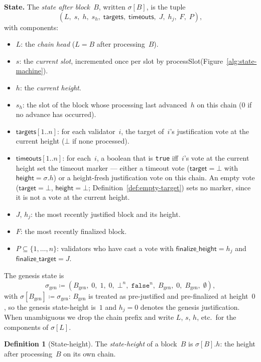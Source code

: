 \ifx\litemode\undefined\documentclass{article}\fi
\newcommand{\genesis}{\ensuremath{B_{\mathrm{gen}}}}
\newcommand{\target}{\mathsf{target}}
\newcommand{\height}{\mathsf{height}}
\newcommand{\finalizeHeight}{\mathsf{finalize\_height}}
\newcommand{\finalizeTarget}{\mathsf{finalize\_target}}
\newcommand{\targets}{\mathsf{targets}}
\newcommand{\timeouts}{\mathsf{timeouts}}
\newcommand{\processSlot}{\textsf{processSlot}\xspace}
\renewcommand{\paragraph}[1]{\vspace{7pt}\noindent\textbf{#1}}
\theoremstyle{plain}
\theoremstyle{definition}
\newtheorem{definition}{Definition}
\theoremstyle{remark}
\begin{document}
\paragraph{State.}
The \emph{state after block~$B$}, written $\sigma[B]$, is the tuple
\[
  (L,\; s,\; h,\; s_h,\; \targets,\; \timeouts,\; J,\; h_j,\; F,\; P),
\]
with components:
\begin{itemize}
  \item $L$: the \emph{chain head} ($L = B$ after processing~$B$).
  \item $s$: the \emph{current slot}, incremented once per slot by \processSlot (Figure~\ref{alg:state-machine}).
  \item $h$: the \emph{current height}.
  \item $s_h$: the slot of the block whose processing last advanced~$h$ on this chain ($0$ if no advance has occurred).
  \item $\targets[1..n]$: for each validator~$i$, the target of~$i$'s justification vote at the current height ($\bot$ if none processed).
  \item $\timeouts[1..n]$: for each~$i$, a boolean that is \texttt{true} iff~$i$'s vote at the current height set the timeout marker --- either a timeout vote ($\target = \bot$ with $\height = \sigma.h$) or a height-fresh justification vote on this chain.  An empty vote ($\target = \bot$, $\height = \bot$; Definition~\ref{def:empty-target}) sets no marker, since it is not a vote at the current height.
  \item $J$, $h_j$: the most recently justified block and its height.
  \item $F$: the most recently finalized block.
  \item $P \subseteq \{1, \ldots, n\}$: validators who have cast a vote with $\finalizeHeight = h_j$ and $\finalizeTarget = J$.
\end{itemize}
The genesis state is
\[
  \sigma_{\mathrm{gen}} \coloneqq (\genesis,\; 0,\; 1,\; 0,\; \bot^n,\; \mathtt{false}^n,\; \genesis,\; 0,\; \genesis,\; \emptyset),
\]
with $\sigma[\genesis] \coloneqq \sigma_{\mathrm{gen}}$: $\genesis$ is treated as pre-justified and pre-finalized at height~$0$, so the genesis state-height is~$1$ and $h_j = 0$ denotes the genesis justification.
When unambiguous we drop the chain prefix and write $L$, $s$, $h$, etc.\ for the components of $\sigma[L]$.

\begin{definition}[State-height]\label{def:sheight}
The \emph{state-height} of a block~$B$ is $\sigma[B].h$: the height after processing~$B$ on its own chain.
\end{definition}
\end{document}

